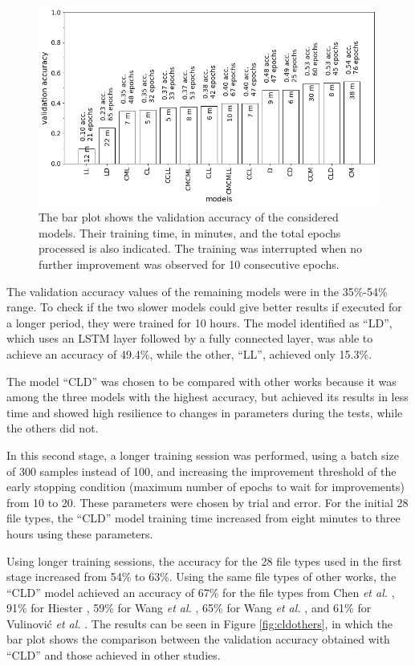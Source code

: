\begin{figure}[htb!]
\centering\includegraphics[width=1.0\textwidth]{content/models.png}
\caption[Validation accuracy of models]{\label{fig:models}The bar plot shows the validation accuracy of the considered models. Their training time, in minutes, and the total epochs processed is also indicated. The training was interrupted when no further improvement was observed for 10 consecutive epochs.}%
\end{figure}

The validation accuracy values of the remaining models were in the 35\%-54\% range.
{\color{red}
To check if the two slower models could give better results if executed for a longer period, they were trained for 10 hours. The model identified as ``LD'', which uses an LSTM layer followed by a fully connected layer, was able to achieve an accuracy of 49.4\%, while the other, ``LL'', achieved only 15.3\%.
}

The model ``CLD'' was chosen to be compared with other works because it was among the three models with the highest accuracy, but achieved its results in less time and showed high resilience to changes in parameters during the tests, while the others did not.

{\color{red}
In this second stage, a longer training session was performed, using a batch size of 300 samples instead of 100, and increasing the improvement threshold of the early stopping condition (maximum number of epochs to wait for improvements) from 10 to 20. These parameters were chosen by trial and error. For the initial 28 file types, the ``CLD'' model training time increased from eight minutes to three hours using these parameters.

Using longer training sessions, the accuracy for the 28 file types used in the first stage increased from 54\% to 63\%. Using the same file types of other works, the ``CLD'' model achieved an accuracy of 
67\% for the file types from Chen \textit{et al.} \cite{chen_file_2018},
91\% for Hiester \cite{hiester_file_2018}, 
59\% for Wang \textit{et al.} \cite{wang_sparse_2018},
65\% for Wang \textit{et al.} \cite{wang_file_2018},
and
61\% for Vulinović \textit{et al.} \cite{vulinovic_neural_2019}.
The results can be seen in Figure \ref{fig:cldothers}, in which the bar plot shows the comparison between the validation accuracy obtained with ``CLD'' and those achieved in other studies.
}

